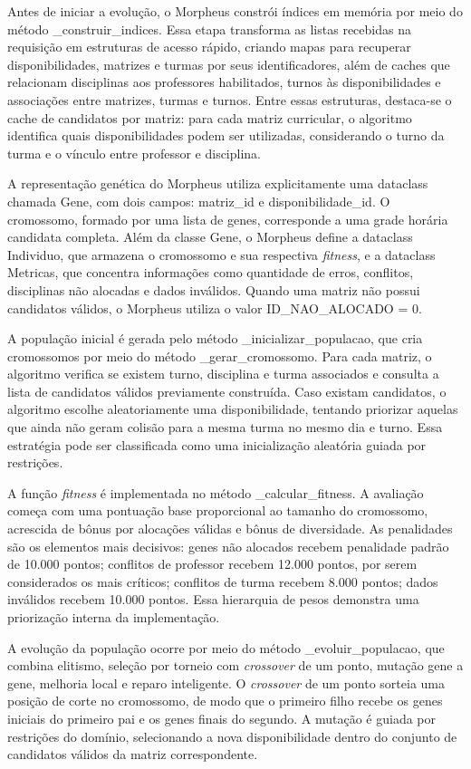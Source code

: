 Antes de iniciar a evolução, o Morpheus constrói índices em memória por meio do método \_construir\_indices. Essa etapa transforma as listas recebidas na requisição em estruturas de acesso rápido, criando mapas para recuperar disponibilidades, matrizes e turmas por seus identificadores, além de caches que relacionam disciplinas aos professores habilitados, turnos às disponibilidades e associações entre matrizes, turmas e turnos. Entre essas estruturas, destaca-se o cache de candidatos por matriz: para cada matriz curricular, o algoritmo identifica quais disponibilidades podem ser utilizadas, considerando o turno da turma e o vínculo entre professor e disciplina.

A representação genética do Morpheus utiliza explicitamente uma dataclass chamada Gene, com dois campos: matriz\_id e disponibilidade\_id. O cromossomo, formado por uma lista de genes, corresponde a uma grade horária candidata completa. Além da classe Gene, o Morpheus define a dataclass Individuo, que armazena o cromossomo e sua respectiva \textit{fitness}, e a dataclass Metricas, que concentra informações como quantidade de erros, conflitos, disciplinas não alocadas e dados inválidos. Quando uma matriz não possui candidatos válidos, o Morpheus utiliza o valor ID\_NAO\_ALOCADO = 0.

A população inicial é gerada pelo método \_inicializar\_populacao, que cria cromossomos por meio do método \_gerar\_cromossomo. Para cada matriz, o algoritmo verifica se existem turno, disciplina e turma associados e consulta a lista de candidatos válidos previamente construída. Caso existam candidatos, o algoritmo escolhe aleatoriamente uma disponibilidade, tentando priorizar aquelas que ainda não geram colisão para a mesma turma no mesmo dia e turno. Essa estratégia pode ser classificada como uma inicialização aleatória guiada por restrições.

A função \textit{fitness} é implementada no método \_calcular\_fitness. A avaliação começa com uma pontuação base proporcional ao tamanho do cromossomo, acrescida de bônus por alocações válidas e bônus de diversidade. As penalidades são os elementos mais decisivos: genes não alocados recebem penalidade padrão de 10.000 pontos; conflitos de professor recebem 12.000 pontos, por serem considerados os mais críticos; conflitos de turma recebem 8.000 pontos; dados inválidos recebem 10.000 pontos. Essa hierarquia de pesos demonstra uma priorização interna da implementação.

A evolução da população ocorre por meio do método \_evoluir\_populacao, que combina elitismo, seleção por torneio com \textit{crossover} de um ponto, mutação gene a gene, melhoria local e reparo inteligente. O \textit{crossover} de um ponto sorteia uma posição de corte no cromossomo, de modo que o primeiro filho recebe os genes iniciais do primeiro pai e os genes finais do segundo. A mutação é guiada por restrições do domínio, selecionando a nova disponibilidade dentro do conjunto de candidatos válidos da matriz correspondente.

